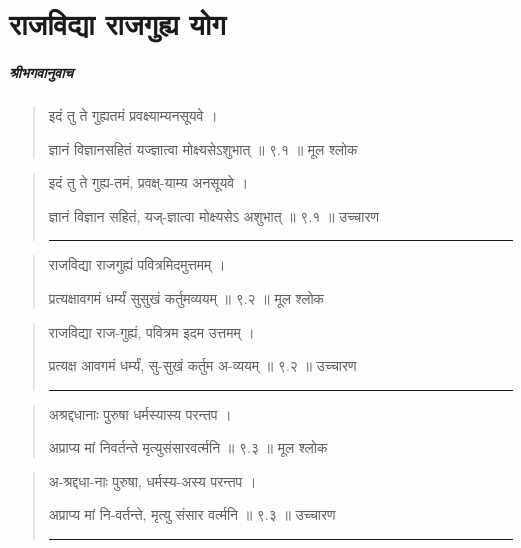 \chapter{\sanskrit राजविद्या राजगुह्य योग}
\paragraph{\sanskrit श्रीभगवानुवाच}
\begin{quotation} 

इदं तु ते गुह्यतमं प्रवक्ष्याम्यनसूयवे  ।  

ज्ञानं विज्ञानसहितं यज्ज्ञात्वा मोक्ष्यसेऽशुभात्‌  ॥ ९.१ ॥  मूल श्लोक
\end{quotation}

\begin{quotation}

इदं तु ते गुह्य-तमं, प्रवक्ष्-याम्य अनसूयवे  ।  

ज्ञानं विज्ञान सहितं, यज्-ज्ञात्वा मोक्ष्यसेऽ अशुभात्‌  ॥ ९.१ ॥  उच्चारण

\noindent\rule{16cm}{0.4pt} 
\end{quotation}


\begin{quotation} 

राजविद्या राजगुह्यं पवित्रमिदमुत्तमम्‌  ।  

प्रत्यक्षावगमं धर्म्यं सुसुखं कर्तुमव्ययम्‌  ॥ ९.२ ॥  मूल श्लोक
\end{quotation}

\begin{quotation}

राजविद्या राज-गुह्यं, पवित्रम इदम उत्तमम्‌  ।  

प्रत्यक्ष आवगमं धर्म्यं, सु-सुखं कर्तुम अ-व्ययम्‌  ॥ ९.२ ॥  उच्चारण

\noindent\rule{16cm}{0.4pt} 
\end{quotation}


\begin{quotation} 

अश्रद्दधानाः पुरुषा धर्मस्यास्य परन्तप  ।  

अप्राप्य मां निवर्तन्ते मृत्युसंसारवर्त्मनि  ॥ ९.३ ॥  मूल श्लोक
\end{quotation}

\begin{quotation}

अ-श्रद्दधा-नाः पुरुषा, धर्मस्य-अस्य परन्तप  ।  

अप्राप्य मां नि-वर्तन्ते, मृत्यु संसार वर्त्मनि  ॥ ९.३ ॥  उच्चारण

\noindent\rule{16cm}{0.4pt} 
\end{quotation}


